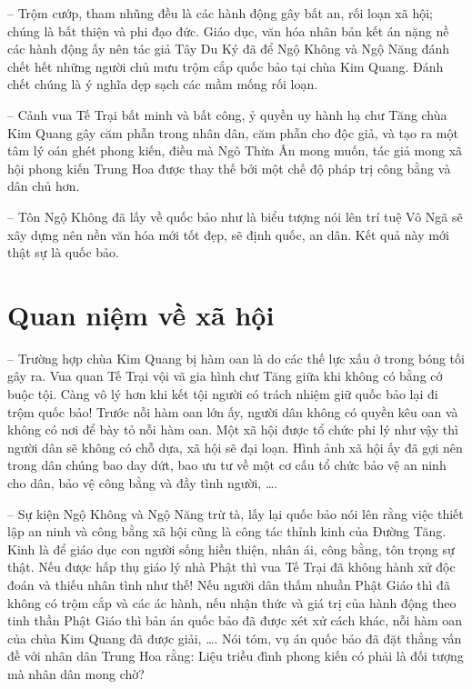 -- Trộm cướp, tham nhũng đều là các hành động gây bất an, rối loạn xã hội; chúng là bất thiện và phi đạo đức. Giáo dục, văn hóa nhân bản kết án nặng nề các hành động ấy nên tác giả Tây Du Ký đã để Ngộ Không và Ngộ Năng đánh chết hết những người chủ mưu trộm cắp quốc bảo tại chùa Kim Quang. Đánh chết chúng là ý nghĩa dẹp sạch các mầm mống rối loạn.

-- Cảnh vua Tế Trại bất minh và bất công, ỷ quyền uy hành hạ chư Tăng chùa Kim Quang gây căm phẫn trong nhân dân, căm phẫn cho độc giả, và tạo ra một tâm lý oán ghét phong kiến, điều mà Ngô Thừa Ân mong muốn, tác giả mong xã hội phong kiến Trung Hoa được thay thế bởi một chế độ pháp trị công bằng và dân chủ hơn.

-- Tôn Ngộ Không đã lấy về quốc bảo như là biểu tượng nói lên trí tuệ Vô Ngã sẽ xây dựng nên nền văn hóa mới tốt đẹp, sẽ định quốc, an dân. Kết quả này mới thật sự là quốc bảo.

\section{Quan niệm về xã hội} %
\label{sec:62_63_xa_hoi}

-- Trường hợp chùa Kim Quang bị hàm oan là do các thế lực xấu ở trong bóng tối gây ra. Vua quan Tế Trại vội vã gia hình chư Tăng giữa khi không có bằng cớ buộc tội. Càng vô lý hơn khi kết tội người có trách nhiệm giữ quốc bảo lại đi trộm quốc bảo! Trước nỗi hàm oan lớn ấy, người dân không có quyền kêu oan và không có nơi để bày tỏ nỗi hàm oan. Một xã hội được tổ chức phi lý như vậy thì người dân sẽ không có chỗ dựa, xã hội sẽ đại loạn. Hình ảnh xã hội ấy đã gợi nên trong dân chúng bao day dứt, bao ưu tư về một cơ cấu tổ chức bảo vệ an ninh cho dân, bảo vệ công bằng và đầy tình người, \ldots.

-- Sự kiện Ngộ Không và Ngộ Năng trừ tà, lấy lại quốc bảo nói lên rằng việc thiết lập an ninh và công bằng xã hội cũng là công tác thỉnh kinh của Đường Tăng. Kinh là để giáo dục con người sống hiền thiện, nhân ái, công bằng, tôn trọng sự thật. Nếu được hấp thụ giáo lý nhà Phật thì vua Tế Trại đã không hành xử độc đoán và thiếu nhân tình như thế! Nếu người dân thấm nhuần Phật Giáo thì đã không có trộm cắp và các ác hành, nếu nhận thức và giá trị của hành động theo tinh thần Phật Giáo thì bản án quốc bảo đã được xét xử cách khác, nỗi hàm oan của chùa Kim Quang đã được giải, \ldots. Nói tóm, vụ án quốc bảo đã đặt thẳng vấn đề với nhân dân Trung Hoa rằng: Liệu triều đình phong kiến có phải là đối tượng mà nhân dân mong chờ?
